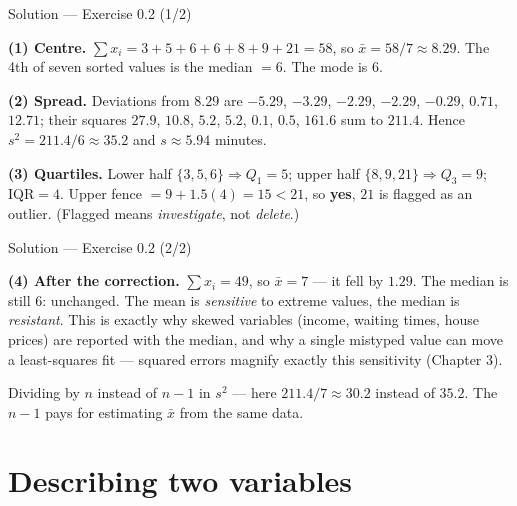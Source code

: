 \documentclass[aspectratio=169,11pt]{beamer}
\begin{document}
\begin{frame}{Solution --- Exercise 0.2 (1/2)}
  \begin{solutionbox}
    \textbf{(1) Centre.} $\sum x_i = 3+5+6+6+8+9+21 = 58$, so
    $\bar x = 58/7 \approx 8.29$. The 4th of seven sorted values is the
    median $= 6$. The mode is $6$.

    \textbf{(2) Spread.} Deviations from $8.29$ are $-5.29$, $-3.29$, $-2.29$,
    $-2.29$, $-0.29$, $0.71$, $12.71$; their squares $27.9$, $10.8$, $5.2$,
    $5.2$, $0.1$, $0.5$, $161.6$ sum to $211.4$. Hence
    $s^2 = 211.4/6 \approx 35.2$ and $s \approx 5.94$ minutes.

    \textbf{(3) Quartiles.} Lower half $\{3,5,6\} \Rightarrow Q_1 = 5$; upper
    half $\{8,9,21\} \Rightarrow Q_3 = 9$; $\mathrm{IQR} = 4$. Upper fence
    $= 9 + 1.5(4) = 15 < 21$, so \textbf{yes}, $21$ is flagged as an outlier.
    (Flagged means \emph{investigate}, not \emph{delete}.)
  \end{solutionbox}
\end{frame}

\begin{frame}{Solution --- Exercise 0.2 (2/2)}
  \begin{solutionbox}
    \textbf{(4) After the correction.} $\sum x_i = 49$, so $\bar x = 7$ ---
    it fell by $1.29$. The median is still $6$: unchanged. The mean is
    \emph{sensitive} to extreme values, the median is \emph{resistant}. This
    is exactly why skewed variables (income, waiting times, house prices)
    are reported with the median, and why a single mistyped value can move a
    least-squares fit --- squared errors magnify exactly this sensitivity
    (Chapter 3).
  \end{solutionbox}
  \begin{mistake}
    Dividing by $n$ instead of $n-1$ in $s^2$ ---
    here $211.4/7 \approx 30.2$ instead of $35.2$. The $n-1$ pays for
    estimating $\bar x$ from the same data.
  \end{mistake}
\end{frame}


\section[Two variables]{Describing two variables}
\end{document}
